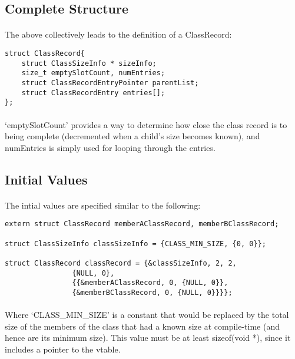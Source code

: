 \documentclass{article}
\begin{document}
\subsection{Complete Structure}

\paragraph{}
The above collectively leads to the definition of a ClassRecord:

\begin{lstlisting}
struct ClassRecord{
	struct ClassSizeInfo * sizeInfo;
	size_t emptySlotCount, numEntries;
	struct ClassRecordEntryPointer parentList;
	struct ClassRecordEntry entries[];
};
\end{lstlisting}

\paragraph{}
`emptySlotCount' provides a way to determine how close the class record is to being complete (decremented when a child's size becomes known), and numEntries is simply used for looping through the entries.

\subsection{Initial Values}

\paragraph{}
The intial values are specified similar to the following:

\begin{lstlisting}
extern struct ClassRecord memberAClassRecord, memberBClassRecord;

struct ClassSizeInfo classSizeInfo = {CLASS_MIN_SIZE, {0, 0}};

struct ClassRecord classRecord = {&classSizeInfo, 2, 2,
				{NULL, 0},
				{{&memberAClassRecord, 0, {NULL, 0}},
				{&memberBClassRecord, 0, {NULL, 0}}}};
\end{lstlisting}

\paragraph{}
Where `CLASS\_MIN\_SIZE' is a constant that would be replaced by the total size of the members of the class that had a known size at compile-time (and hence are its minimum size). This value must be at least sizeof(void *), since it includes a pointer to the vtable.
\end{document}
